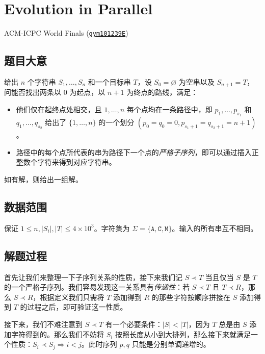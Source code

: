 \documentclass[12pt]{ctexart}
\begin{document}
\section{Evolution in Parallel}

\begin{source} ACM-ICPC World Finals (\href{https://codeforces.com/gym/101239/}{\texttt{gym101239E}})
\end{source}

\subsection{题目大意}

给出 $n$ 个字符串 $S_1, \dots, S_n$ 和一个目标串 $T$，设 $S_0=\varnothing$ 为空串以及 $S_{n+1}=T$，问能否找出两条以 $0$ 为起点，以 $n+1$ 为终点的路线，满足：

\begin{itemize}
\item 他们仅在起终点处相交，且 $1,\dots,n$ 每个点均在一条路径中，即 $p_1,\dots,p_{s_1}$ 和 $q_1,\dots,q_{s_2}$ 给出了 $\{1,\dots,n\}$ 的一个划分 $(p_0=q_0=0, p_{s_1+1}=q_{s_2+1}=n+1)$。
\item 路径中的每个点所代表的串为路径下一个点的\emph{严格子序列}，即可以通过插入正整数个字符来得到对应字符串。
\end{itemize}

如有解，则给出一组解。

\subsection{数据范围}

保证 $1\le n, |S_i|, |T|\le 4\times 10^3$。字符集为 $\Sigma = \{\texttt{A},\texttt{C},\texttt{M}\}$。输入的所有串互不相同。

\subsection{解题过程}

首先让我们来整理一下子序列关系的性质，接下来我们记 $S \prec T$ 当且仅当 $S$ 是 $T$ 的一个严格子序列。我们容易发现这一关系具有\emph{传递性}：若 $S\prec T$ 且 $T\prec R$，那么 $S\prec R$，根据定义我们只需将 $T$ 添加得到 $R$ 的那些字符按顺序拼接在 $S$ 添加得到 $T$ 的过程之后，即可验证这一性质。

接下来，我们不难注意到 $S\prec T$ 有一个必要条件：$|S|<|T|$，因为 $T$ 总是由 $S$ 添加字符得到的。那么我们不妨将 $S_i$ 按照长度从小到大排列，那么接下来就满足一个性质：$S_i \prec S_j \Rightarrow i < j$。此时序列 $p,q$ 只能是分别单调递增的。
\end{document}
